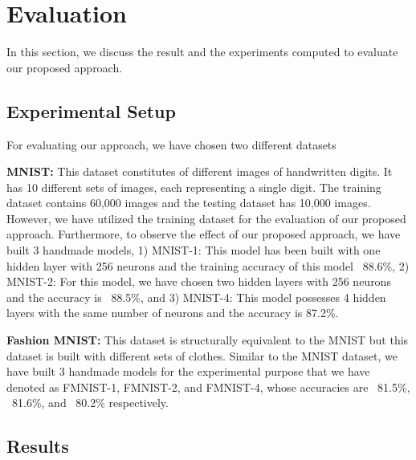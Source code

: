 \section{Evaluation}
\label{sec:evaluation}
In this section, we discuss the result and the experiments computed to evaluate our proposed approach.
\subsection{Experimental Setup}
For evaluating our approach, we have chosen two different datasets

\textbf{MNIST:}
This dataset \cite{lecun1998gradient} constitutes of different images of handwritten digits. It has 10 different sets of images, each representing a single digit. The training dataset contains 60,000 images and the testing dataset has 10,000 images. However, we have utilized the training dataset for the evaluation of our proposed approach. Furthermore, to observe the effect of our proposed approach, we have built 3 handmade models, 1) MNIST-1: This model has been built with one hidden layer with 256 neurons and the training accuracy of this model ~88.6\%, 2) MNIST-2: For this model, we have chosen two hidden layers with 256 neurons and the accuracy is ~88.5\%, and 3) MNIST-4: This model possesses 4 hidden layers with the same number of neurons and the accuracy is 87.2\%.

\textbf{Fashion MNIST:}
This dataset \cite{xiao2017fashion} is structurally equivalent to the MNIST but this dataset is built with different sets of clothes. Similar to the MNIST dataset, we have built 3 handmade models for the experimental purpose that we have denoted as FMNIST-1, FMNIST-2, and FMNIST-4, whose accuracies are ~81.5\%, ~81.6\%, and ~80.2\% respectively.
\subsection{Results}
\label{subsec:result}
